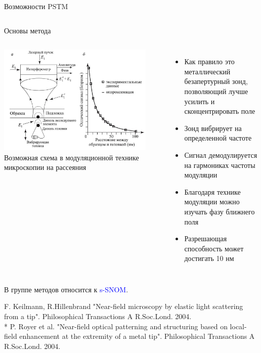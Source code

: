 \documentclass[9pt, compress, xcolor=table]{beamer}
\begin{document}
\begin{frame}{Возможности PSTM}
\begin{columns}[c]
\end{columns}

\end{frame}


\begin{frame}{Основы метода}
\begin{columns}[c]
\column{6.5cm}
\begin{center}
\includegraphics[width=0.9\textwidth]{nfm14}
\newline Возможная схема в модуляционной технике микроскопии на рассеяния
\end{center}

\column{6cm}
\begin{itemize}
\item Как правило это металлический безапертурный зонд, позволяющий лучше усилить и сконцентрировать поле
\item Зонд вибрирует на определенной частоте
\item Сигнал демодулируется на гармониках частоты модуляции
\item Благодаря технике модуляции можно изучать фазу ближнего поля
\item Разрешающая способность может достигать 10 нм
\end{itemize}

\end{columns}
В группе методов относится к \textcolor{blue}{s-SNOM}.

\small{F. Keilmann, R.Hillenbrand "Near-field microscopy by elastic light scattering from a tip". Philosophical Transactions A R.Soc.Lond. 2004.
\\*
P. Royer et al. "Near-field optical patterning and structuring based on local-field enhancement at the extremity of a metal tip". Philosophical Transactions A R.Soc.Lond. 2004.}
\end{frame}
\end{document}
